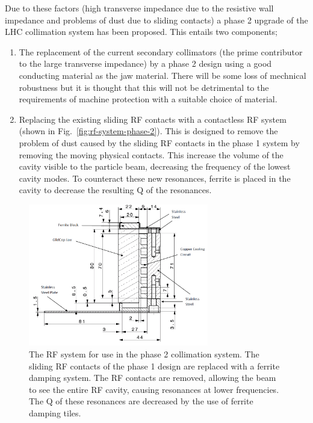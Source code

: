 Due to these factors (high transverse impedance due to the resistive wall impedance and problems of dust due to sliding contacts) a phase 2 upgrade of the LHC collimation system has been proposed. This entails two components;

\begin{enumerate}
\item{The replacement of the current secondary collimators (the prime contributor to the large transverse impedance) by a phase 2 design using a good conducting material as the jaw material. There will be some loss of mechnical robustness but it is thought that this will not be detrimental to the requirements of machine protection with a suitable choice of material.}
\item{Replacing the existing sliding RF contacts with a contactless RF system (shown in Fig.~\ref{fig:rf-system-phase-2}). This is designed to remove the problem of dust caused by the sliding RF contacts in the phase 1 system by removing the moving physical contacts. This increase the volume of the cavity visible to the particle beam, decreasing the frequency of the lowest cavity modes. To counteract these new resonances, ferrite is placed in the cavity to decrease the resulting Q of the resonances.}
\end{enumerate}

\begin{figure}
\begin{center}
\includegraphics[width=0.7\textwidth]{LHC_Collimation_Upgrades/figures/cu-geo.png}
\end{center}
\label{fig:phase-2-rf-system}
\caption{The RF system for use in the phase 2 collimation system. The sliding RF contacts of the phase 1 design are replaced with a ferrite damping system. The RF contacts are removed, allowing the beam to see the entire RF cavity, causing resonances at lower frequencies. The Q of these resonances are decreased by the use of ferrite damping tiles.}
\end{figure}

